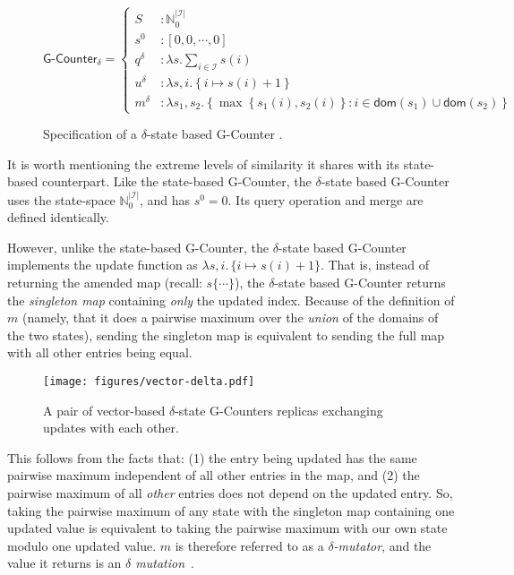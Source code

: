 \begin{figure}[H]
  \centering
  \[
    \textsf{G-Counter}_\delta = \left\{\begin{aligned}
      S &: \mathbb{N}_0^{|\mathcal{I}|} \\
      s^0 &: \left[ 0, 0, \cdots, 0 \right] \\
      q^\delta &: \lambda s. \sum_{i \in \mathcal{I}} s(i) \\
      u^\delta &: \lambda s,i. \left\{ i \mapsto s(i) + 1 \right\} \\
      m^\delta &: \lambda s_1, s_2. \left\{ \max\left\{ s_1(i), s_2(i) \right\}: i \in \mathsf{dom}(s_1) \cup
      \mathsf{dom}(s_2) \right\}
    \end{aligned}\right.
  \]
  \caption{Specification of a $\delta$-state based \textsf{G-Counter} \CRDT.}
\end{figure}

It is worth mentioning the extreme levels of similarity it shares with its
state-based counterpart. Like the state-based G-Counter, the $\delta$-state based
G-Counter uses the state-space $\mathbb{N}^{|\mathcal{I}|}_0$, and has $s^0 = 0$.
Its query operation and merge are defined identically.

However, unlike the state-based G-Counter, the $\delta$-state based G-Counter
implements the update function as $\lambda s,i.\, \{ i \mapsto s(i) + 1\}$. That
is, instead of returning the amended map (recall: $s\{ \cdots \}$), the
$\delta$-state based G-Counter returns the \emph{singleton map} containing
\emph{only} the updated index. Because of the definition of $m$ (namely, that it
does a pairwise maximum over the \emph{union} of the domains of the two states),
sending the singleton map is equivalent to sending the full map with all other
entries being equal.

\begin{figure}[H]
  \centering
  \texttt{[image: figures/vector-delta.pdf]}
  \caption{A pair of vector-based $\delta$-state G-Counters replicas exchanging
    updates with each other.}
\end{figure}

This follows from the facts that: (1) the entry being updated has the same
pairwise maximum independent of all other entries in the map, and (2) the
pairwise maximum of all \emph{other} entries does not depend on the updated
entry. So, taking the pairwise maximum of any state with the singleton map
containing one updated value is equivalent to taking the pairwise maximum with
our own state modulo one updated value. $m$ is therefore referred to as a
\emph{$\delta$-mutator}, and the value it returns is an \emph{$\delta$
mutation}~\citep{almedia18}.

